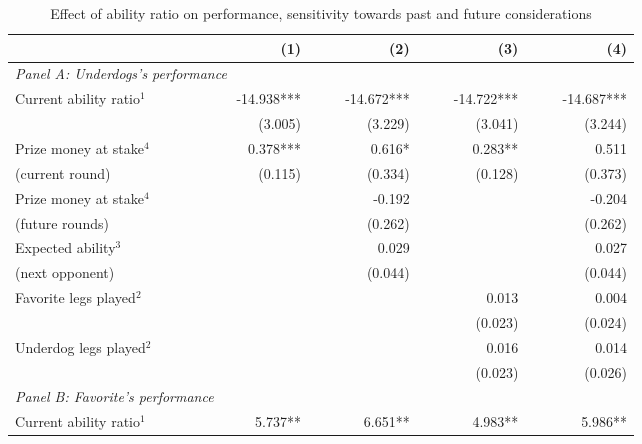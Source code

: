 \documentclass[11pt,a4paper]{article}
\begin{document}
	\begin{table}[H]
		\centering
		\caption{Effect of ability ratio on performance, sensitivity towards past and future considerations} 
		\label{apptab:table_main_perf_sens}
		\begin{tabular}{l r r r r r r r r } 
			\toprule \toprule
			\textbf{}                    & ~~ & (1)    & ~~ &  (2)   & ~~ &  (3)  & ~~ &  (4)       \\ 
			\midrule
            \multicolumn{9}{l}{\textit{Panel A: Underdogs's performance}} \vspace{0.7em}\\ 
		Current ability ratio$^1$ ~~~~~~   & &  -14.938***   & & -14.672*** & & -14.722*** & & -14.687***      \\
			                               & &   (3.005)     & & (3.229)    & &  (3.041)   & &  (3.244)        \\
			Prize money at stake$^4$       & &   0.378***    & &  0.616*    & &   0.283**  & &  0.511          \\
			(current round)                & &   (0.115)     & & (0.334)    & &  (0.128)   & &  (0.373)        \\
			Prize money at stake$^4$       & &               & &  -0.192    & &            & &  -0.204         \\
			(future rounds)                & &               & &  (0.262)   & &            & &  (0.262)        \\
			Expected ability$^3$           & &               & &  0.029     & &            & &   0.027         \\
			(next opponent)                & &               & &  (0.044)   & &            & &  (0.044)        \\
			Favorite legs played$^2$       & &               & &            & &  0.013     & &  0.004          \\
			                               & &               & &            & &   (0.023)  & &  (0.024)        \\
			Underdog legs played$^2$       & &               & &            & & 0.016      & &  0.014          \\
			                               & &               & &            & &  (0.023)   & &  (0.026)        \\
			\midrule
            \multicolumn{9}{l}{\textit{Panel B: Favorite's performance}} \vspace{0.7em} \\ 
			Current ability ratio$^1$      & &  5.737**      & & 6.651**    & &  4.983**   & &  5.986**        \\

\end{tabular}
\end{table}
\end{document}
